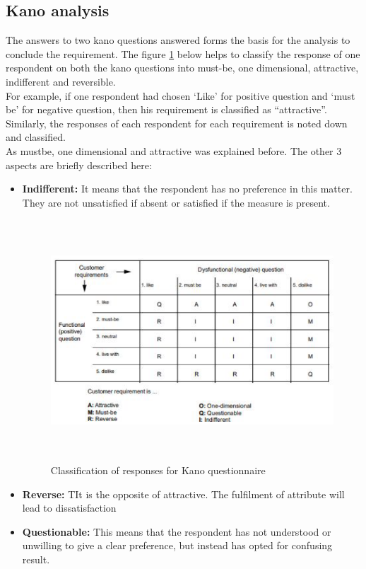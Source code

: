 \subsection{Kano analysis}
The answers to two kano questions answered forms the basis for the analysis to conclude the requirement. The figure \ref{fig:4.6} below helps to classify the response of one respondent on both the kano questions into must-be, one dimensional, attractive, indifferent and reversible.\\

For example, if one respondent had chosen ‘Like’ for positive question and ‘must be’ for negative question, then his requirement is classified as “attractive”. Similarly, the responses of each respondent for each requirement is noted down and classified.\\

As mustbe, one dimensional and attractive was explained before. The other 3 aspects are briefly described here:

\begin{itemize}
\item \textbf{Indifferent:} It means that the respondent has no preference in this matter. They are not unsatisfied if absent or satisfied if the measure is present.\\
    \begin{figure}[H]
    \centering
    \captionsetup{justification=centering, margin=2cm}
    \vspace{1cm}
    \includegraphics[width=14cm, height=9cm]{figure/auxiliary/fig46.PNG}
    \caption{ Classification of responses for Kano questionnaire}
    \label{fig:4.6}
\end{figure}



\item \textbf{Reverse:} TIt is the opposite of attractive. The fulfilment of attribute will lead to dissatisfaction\\

\item \textbf{Questionable:} This means that the respondent has not understood or unwilling to give a clear preference, but instead has opted for confusing result.\\
\end{itemize}


